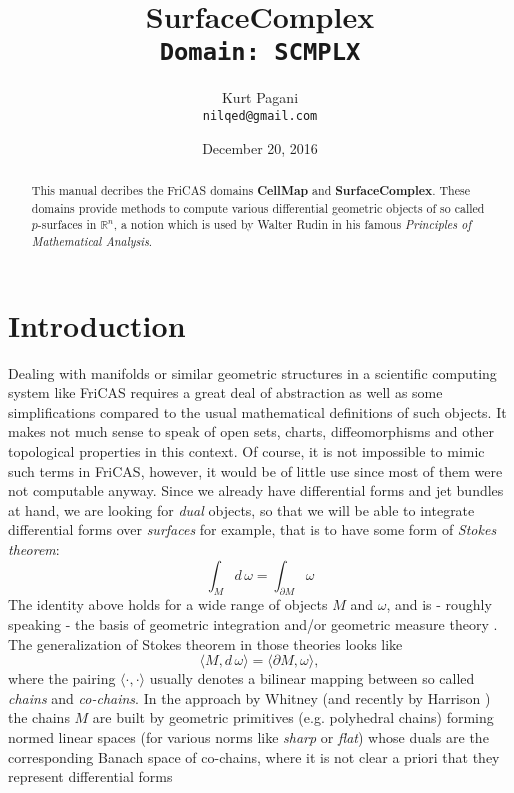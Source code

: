 \documentclass[12pt,a4paper]{article}
\author{Kurt Pagani \\ {\tt nilqed@gmail.com}}
\date{December 20, 2016}
\title{SurfaceComplex \\ {\small\tt Domain: SCMPLX}}
\newcommand{\RR}[1]{\mathbb{R}^{#1}}
\begin{document}
\maketitle
%
\begin{abstract}
This manual decribes the FriCAS domains {\bf CellMap} and 
{\bf SurfaceComplex}. These domains provide methods to compute
various differential geometric objects of so called $p$-surfaces
in ${\RR n}$, a notion which is used by Walter Rudin in his famous
{\it Principles of Mathematical Analysis}. 
\end{abstract}
%
\tableofcontents
\section{Introduction}
%
Dealing with manifolds or similar geometric structures in a scientific
computing system like FriCAS requires a great deal of abstraction as well
as some simplifications compared to the usual mathematical definitions of
such objects. It makes not much sense to speak of open sets, charts,
diffeomorphisms and other topological properties in this context. Of 
course, it is not impossible to mimic such terms in FriCAS, however,
it would be of little use since most of them were not computable
anyway. Since we already have differential forms and jet bundles at
hand, we are looking for {\it dual} objects, so that we will be able
to integrate differential forms over {\it surfaces} for example, that
is to have some form of {\em Stokes theorem}:
\begin{displaymath}
  \int_{M} d\,\omega = \int_{\partial M} \omega
\end{displaymath}   
The identity above holds for a wide range of objects $M$ and $\omega$,
and is - roughly speaking - the basis of geometric integration 
\cite{GIT} and/or geometric measure theory \cite{GMT}. The generalization
of Stokes theorem in those theories looks like
\begin{displaymath}
    \langle M,d\, \omega\rangle = \langle \partial M, \omega \rangle,
\end{displaymath}  
where the pairing $\langle\cdot,\cdot\rangle$ usually denotes a bilinear
mapping between so called {\em chains} and {\em co-chains}. In the 
approach \cite{GIT} by Whitney (and recently by Harrison \cite{JH}) the
chains $M$ are built by geometric primitives (e.g. polyhedral chains)
forming normed linear spaces (for various norms like {\em sharp} or
{\em flat}) whose duals are the corresponding Banach space of co-chains,
where it is not clear a priori that they represent differential forms 
\end{document}
